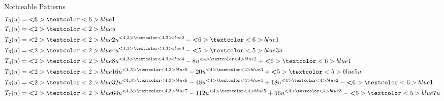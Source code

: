 \documentclass{beamer}
\begin{document}
\begin{frame}{Noticeable Patterns}
 \vspace{-18pt}
 \tiny{}
 \begin{align*}
  T_0(u) & = \textbf<6>{\textcolor<6>{blue}{1}}                                                                                                                                                                                                                         \\
  T_1(u) & = \textbf<2>{\textcolor<2>{blue}{u}}                                                                                                                                                                                                                         \\
  T_2(u) & = \textbf<2>{\textcolor<2>{blue}{2}} u^{\textbf<4,3>{\textcolor<4,3>{blue}{2}}} - \textbf<6>{\textcolor<6>{blue}{1}}                                                                                                                                         \\
  T_3(u) & = \textbf<2>{\textcolor<2>{blue}{4}} u^{\textbf<4,3>{\textcolor<4,3>{blue}{3}}} - \textbf<5>{\textcolor<5>{blue}{3}} u                                                                                                                                       \\
  T_4(u) & = \textbf<2>{\textcolor<2>{blue}{8}} u^{\textbf<4,3>{\textcolor<4,3>{blue}{4}}} - 8u^{\textbf<4>{\textcolor<4>{blue}{2}}} + \textbf<6>{\textcolor<6>{blue}{1}}                                                                                               \\
  T_5(u) & = \textbf<2>{\textcolor<2>{blue}{16}} u^{\textbf<4,3>{\textcolor<4,3>{blue}{5}}} - 20u^{\textbf<4>{\textcolor<4>{blue}{3}}} + \textbf<5>{\textcolor<5>{blue}{5}} u                                                                                           \\
  T_6(u) & = \textbf<2>{\textcolor<2>{blue}{32}} u^{\textbf<4,3>{\textcolor<4,3>{blue}{6}}} - 48u^{\textbf<4>{\textcolor<4>{blue}{4}}} + 18u^{\textbf<4>{\textcolor<4>{blue}{2}}} - \textbf<6>{\textcolor<6>{blue}{1}}                                                  \\
  T_7(u) & = \textbf<2>{\textcolor<2>{blue}{64}} u^{\textbf<4,3>{\textcolor<4,3>{blue}{7}}} - 112u^{\textbf<4>{\textcolor<4>{blue}{5}}} + 56u^{\textbf<4>{\textcolor<4>{blue}{3}}} - \textbf<5>{\textcolor<5>{blue}{7}} u                                               \\

\end{align*}
\end{frame}
\end{document}
